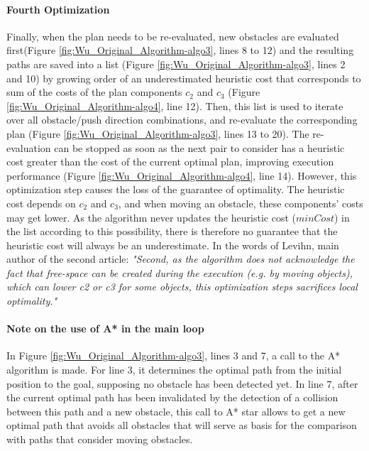 \paragraph{Fourth Optimization}\label{optimization_4} Finally, when the plan needs to be re-evaluated, new obstacles are evaluated first(Figure \ref{fig:Wu_Original_Algorithm-algo3}, lines 8 to 12) and the resulting paths are saved into a list (Figure \ref{fig:Wu_Original_Algorithm-algo3}, lines 2 and 10) by growing order of an underestimated heuristic cost that corresponds to sum of the costs of the plan components $c_{2}$ and $c_{3}$ (Figure \ref{fig:Wu_Original_Algorithm-algo4}, line 12). Then, this list is used to iterate over all obstacle/push direction combinations, and re-evaluate the corresponding plan (Figure \ref{fig:Wu_Original_Algorithm-algo3}, lines 13 to 20). The re-evaluation can be stopped as soon as the next pair to consider has a heuristic cost greater than the cost of the current optimal plan, improving execution performance (Figure \ref{fig:Wu_Original_Algorithm-algo4}, line 14). However, this optimization step causes the loss of the guarantee of optimality. The heuristic cost depends on $c_{2}$ and $c_{3}$, and when moving an obstacle, these components' costs may get lower. As the algorithm never updates the heuristic cost ($minCost$) in the list according to this possibility, there is therefore no guarantee that the heuristic cost will always be an underestimate. In the words of Levihn, main author of the second article:  \textit{"Second, as the algorithm does not acknowledge the fact that free-space can be created during the execution (e.g. by moving objects), which can lower c2 or c3 for some objects, this optimization steps sacrifices local optimality."} \parencite{levihn_locally_2014}

\paragraph{Note on the use of A* in the main loop} In Figure \ref{fig:Wu_Original_Algorithm-algo3}, lines 3 and 7, a call to the A* algorithm is made. For line 3, it determines the optimal path from the initial position to the goal, supposing no obstacle has been detected yet. In line 7, after the current optimal path has been invalidated by the detection of a collision between this path and a new obstacle, this call to A* star allows to get a new optimal path that avoids all obstacles that will serve as basis for the comparison with paths that consider moving obstacles.


